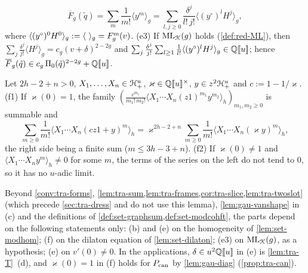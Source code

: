 \begin{lem}
\begin{description}
\[
\overline F_g(\tilde q) = \sum_m\frac1{m!}\langle y^m\rangle_g = \sum_{l,j\geq 0}\frac{\delta^j}{l!\,j!}\langle(y^\circ)^lH^j\rangle_g,
\]
where $\langle(y^\circ)^0H^0\rangle_g := \langle\ \rangle_g = F^{\mathrm{m}}_g(v)$. (e3) If $\mathrm{ML}_{\mathcal{K}}(g)$ holds (\cref{def:red-ML}), then $\sum_j\frac{\delta^j}{j!}\langle H^j\rangle_g = c_g(v+\delta)^{2-2g}$ and $\sum_j\frac{\delta^j}{j!}\sum_{l\geq 1}\frac1{l!}\langle(y^\circ)^lH^j\rangle_g\in\mathbb{Q}[\![ u ]\!]$; hence $\overline F_g(\tilde q)\in c_g\,\Pi_0(\tilde q)^{2-2g}+\mathbb{Q}[\![ u ]\!]$.
\item[(f) Dilaton re-expansion] Let $2h-2+n>0$, $X_1,\dots,X_n\in\mathcal{H}^u_+$, $\varkappa\in\mathbb{Q}[\![ u ]\!]^\times$, $y\in z^2\mathcal{H}^u_+$ and $c := 1-1/\varkappa$. (f1) If $\varkappa(0) = 1$, the family $(\frac{c^{m_1}}{m_1!\,m_2!}\langle X_1\cdots X_n(z1)^{m_1}y^{m_2}\rangle_h)_{m_1,m_2\geq 0}$ is summable and
\[
\sum_{m\geq 0}\frac1{m!}\langle X_1\cdots X_n(cz1+y)^m\rangle_h = \varkappa^{2h-2+n}\sum_{m\geq 0}\frac1{m!}\langle X_1\cdots X_n(\varkappa y)^m\rangle_h ,
\]
the right side being a finite sum ($m\leq 3h-3+n$). (f2) If $\varkappa(0)\neq 1$ and $\langle X_1\cdots X_ny^{m}\rangle_h\neq 0$ for some $m$, the terms of the series on the left do not tend to $0$, so it has no $u$-adic limit.
\end{description}
Beyond \cref{conv:tra-forms}, \cref{lem:tra-sum,lem:tra-frames,cor:tra-slice,lem:tra-twoslot} (which precede \cref{sec:tra-dress} and do not use this lemma), \cref{lem:gau-vanshape} in (c) and the definitions of \cref{def:set-graphsum,def:set-modcohft}, the parts depend on the following statements only: (b) and (e) on the homogeneity of \cref{lem:set-modhom}; (f) on the dilaton equation of \cref{lem:set-dilaton}; (e3) on $\mathrm{ML}_{\mathcal{K}}(g)$, as a hypothesis; (e) on $v'(0)\neq 0$. In the applications, $\delta\in u^2\mathbb{Q}[\![ u ]\!]$ in (e) is \cref{lem:tra-T}~(d), and $\varkappa(0) = 1$ in (f) holds for $P_{\mathrm{can}}$ by \cref{lem:gau-diag} (\cref{prop:tra-can}).
\end{lem}

